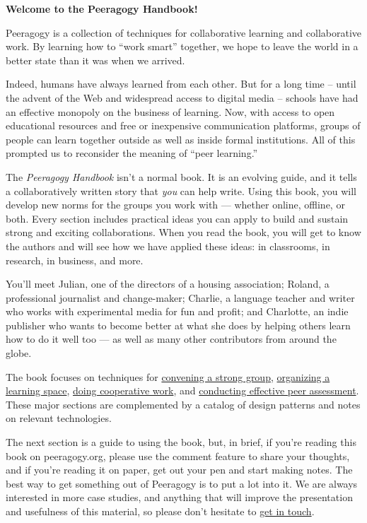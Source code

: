 \textbf{Welcome to the Peeragogy Handbook!}

Peeragogy is a collection of techniques for collaborative learning and
collaborative work. By learning how to ``work smart'' together, we hope
to leave the world in a better state than it was when we arrived.

Indeed, humans have always learned from each other. But for a long time
-- until the advent of the Web and widespread access to digital media --
schools have had an effective monopoly on the business of learning. Now,
with access to open educational resources and free or inexpensive
communication platforms, groups of people can learn together outside as
well as inside formal institutions. All of this prompted us to
reconsider the meaning of ``peer learning.''

The \emph{Peeragogy Handbook} isn't a normal book. It is an evolving
guide, and it tells a collaboratively written story that \emph{you} can
help write. Using this book, you will develop new norms for the groups
you work with --- whether online, offline, or both. Every section
includes practical ideas you can apply to build and sustain strong and
exciting collaborations. When you read the book, you will get to know
the authors and will see how we have applied these ideas: in classrooms,
in research, in business, and more.

You'll meet Julian, one of the directors of a housing association;
Roland, a professional journalist and change-maker; Charlie, a language
teacher and writer who works with experimental media for fun and profit;
and Charlotte, an indie publisher who wants to become better at what she
does by helping others learn how to do it well too --- as well as many
other contributors from around the globe.

The book focuses on techniques for
\href{http://peeragogy.org/convene/}{convening a strong group},
\href{http://peeragogy.org/organize/}{organizing a learning space},
\href{http://peeragogy.org/cowork/}{doing cooperative work}, and
\href{http://peeragogy.org/assessment/}{conducting effective peer
assessment}. These major sections are complemented by a catalog of
design patterns and notes on relevant technologies.

The next section is a guide to using the book, but, in brief, if you're
reading this book on peeragogy.org, please use the comment feature to
share your thoughts, and if you're reading it on paper, get out your pen
and start making notes. The best way to get something out of Peeragogy
is to put a lot into it. We are always interested in more case studies,
and anything that will improve the presentation and usefulness of this
material, so please don't hesitate to
\href{http://peeragogy.org/contact/}{get in touch}.

